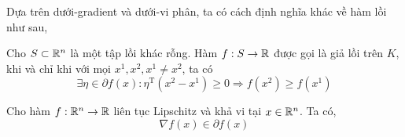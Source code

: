 Dựa trên dưới-gradient và dưới-vi phân, ta có cách định nghĩa khác về hàm lồi như sau,
\begin{dn} 
    Cho $S \subset \mathbb{R}^n$ là một tập lồi khác rỗng. Hàm $f: S \rightarrow \mathbb{R}$ được gọi là giả lồi trên $K$, khi và chỉ khi với mọi $x^1, x^2, x^1 \neq x^2$, ta có
    \begin{equation*}
        \exists \eta \in \partial f(x): \eta^{\mathrm{T}}\left(x^2-x^1\right) \geq 0 \Rightarrow f\left(x^2\right) \geq f(x^1)
    \end{equation*}
\end{dn}
\begin{dl} 
Cho hàm $f: \mathbb{R}^n \rightarrow \mathbb{R}$ liên tục Lipschitz và khả vi tại $x \in \mathbb{R}^n$. Ta có,
\begin{equation*}
    \nabla f(x) \in \partial f(x)
\end{equation*}
\end{dl}

